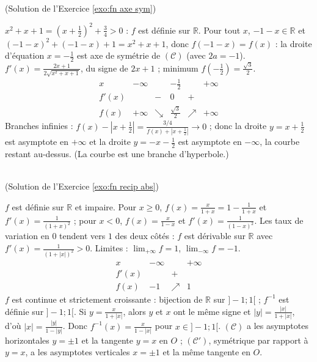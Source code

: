 \begin{corrige}
\begin{sol} ~ \\
(Solution de l'Exercice \ref{exo:fn axe sym})

$x^2 + x + 1 = \left(x + \frac{1}{2}\right)^2 + \frac{3}{4} > 0$ : $f$ est d\'efinie sur $\mathbb{R}$.
Pour tout $x$, $-1 - x \in \mathbb{R}$ et $(-1-x)^2 + (-1-x) + 1 = x^2 + x + 1$, donc $f(-1-x) = f(x)$ :
la droite d'\'equation $x = -\frac{1}{2}$ est axe de sym\'etrie de $(\mathscr{C})$ (avec $2a = -1$).
$f'(x) = \frac{2x+1}{2\sqrt{x^2+x+1}}$, du signe de $2x + 1$ ; minimum $f\left(-\frac{1}{2}\right) = \frac{\sqrt{3}}{2}$.
\[
\begin{array}{c|ccccc}
x & -\infty & & -\frac{1}{2} & & +\infty \\ \hline
f'(x) & & - & 0 & + & \\ \hline
f(x) & +\infty & \searrow & \frac{\sqrt{3}}{2} & \nearrow & +\infty
\end{array}
\]
Branches infinies : $f(x) - \left|x + \frac{1}{2}\right| = \frac{3/4}{f(x) + \left|x + \frac{1}{2}\right|} \to 0$ ; donc la droite $y = x + \frac{1}{2}$
est asymptote en $+\infty$ et la droite $y = -x - \frac{1}{2}$ est asymptote en $-\infty$, la courbe restant au-dessus.
(La courbe est une branche d'hyperbole.)
\end{sol}

\begin{sol} ~ \\
(Solution de l'Exercice \ref{exo:fn recip abs})

$f$ est d\'efinie sur $\mathbb{R}$ et impaire. Pour $x \geq 0$, $f(x) = \frac{x}{1+x} = 1 - \frac{1}{1+x}$ et $f'(x) = \frac{1}{(1+x)^2}$ ;
pour $x < 0$, $f(x) = \frac{x}{1-x}$ et $f'(x) = \frac{1}{(1-x)^2}$. Les taux de variation en $0$ tendent vers $1$ des deux c\^ot\'es :
$f$ est d\'erivable sur $\mathbb{R}$ avec $f'(x) = \frac{1}{(1+|x|)^2} > 0$. Limites : $\lim_{+\infty} f = 1$, $\lim_{-\infty} f = -1$.
\[
\begin{array}{c|ccc}
x & -\infty & & +\infty \\ \hline
f'(x) & & + & \\ \hline
f(x) & -1 & \nearrow & 1
\end{array}
\]
$f$ est continue et strictement croissante : bijection de $\mathbb{R}$ sur $]-1;1[$ ; $f^{-1}$ est d\'efinie sur $]-1;1[$.
Si $y = \frac{x}{1+|x|}$, alors $y$ et $x$ ont le m\^eme signe et $|y| = \frac{|x|}{1+|x|}$, d'o\`u $|x| = \frac{|y|}{1 - |y|}$.
Donc $\boxed{f^{-1}(x) = \frac{x}{1 - |x|}}$ pour $x \in ]-1;1[$.
$(\mathscr{C})$ a les asymptotes horizontales $y = \pm 1$ et la tangente $y = x$ en $O$ ; $(\mathscr{C}')$, sym\'etrique par rapport \`a $y = x$,
a les asymptotes verticales $x = \pm 1$ et la m\^eme tangente en $O$.
\end{sol}


\end{corrige}
